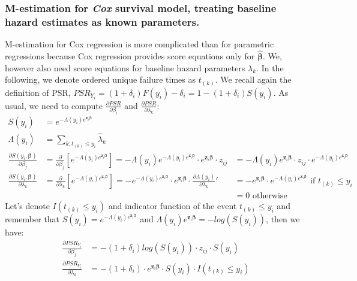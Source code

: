 \documentclass[]{article}
\begin{document}
\subsubsection{M-estimation for \emph{Cox} survival model, treating baseline hazard estimates as known parameters.}
M-estimation for Cox regression is more complicated than for parametric regressions because Cox regression provides score equations only for $\hat{\pmb{\beta}}$. We, however also need score equations for baseline hazard parameters $\lambda_k$. In the following, we denote ordered unique failure times as $t_{(k)}$. We recall again the definition of PSR, $PSR_{Y_i} =  (1+\delta_i) F(y_i)  -  \delta_i = 1- (1+\delta_i) S(y_i)$. 
As usual, we need to compute $\frac{\partial PSR}{\partial \beta_i}$ and $\frac{\partial PSR}{\partial \lambda_k}$:
$$
  \begin{aligned}
    S(y_i) &=  e^{-\Lambda(y_i) e^{\pmb{z}_i\pmb{\beta}}} \\
    \Lambda(y_i)  &= \sum_{k: t_{(k)}\leq y_i} \hat{\lambda}_k\\
    \frac{\partial S(y_i, \pmb{\beta})}{\partial \beta_j} &= \frac{\partial}{\partial \beta_j}\left[  e^{-\Lambda(y_i) e^{\pmb{z}_i\pmb{\beta}}}  \right] =   -\Lambda(y_i)e^{-\Lambda(y_i) e^{\pmb{z}_i\pmb{\beta}}}  \cdot  e^{\pmb{z}_i\pmb{\beta}}   \cdot z_{ij} &=  -\Lambda(y_i) e^{\pmb{z}_i\pmb{\beta}}   \cdot  z_{ij}  \cdot  e^{-\Lambda(y_i) e^{\pmb{z}_i\pmb{\beta}}} \\
    \frac{\partial S(y_i, \pmb{\beta})}{\partial \lambda_k} &= \frac{\partial}{\partial \lambda_k}\left[  e^{-\Lambda(y_i) e^{\pmb{z}_i\pmb{\beta}}}  \right] =   -e^{-\Lambda(y_i) e^{\pmb{z}_i\pmb{\beta}}}  \cdot  e^{\pmb{z}_i\pmb{\beta}}\cdot \frac{\partial \Lambda(y_i)}{\partial \lambda_k}' &=   -e^{\pmb{z}_i\pmb{\beta}}   \cdot  e^{-\Lambda(y_i) e^{\pmb{z}_i\pmb{\beta}}}\text{ if } t_{(k)}\leq y_i\\
    & & = 0\text{ otherwise}
  \end{aligned}
  $$
Let's denote $I(t_{(k)}\leq y_i)$ and indicator function of the event $t_{(k)}\leq y_i$ and remember that $S(y_i) =  e^{-\Lambda(y_i) e^{\pmb{z}_i\pmb{\beta}}}$ and $\Lambda(y_i) e^{\pmb{z}_i\pmb{\beta}} = -log\left(S(y_i)\right)$, then we have:
$$
  \begin{aligned}
    \frac{\partial PSR_{Y_i}}{\partial \beta_j} &=  -(1+\delta_i)log\left(S(y_i)\right) \cdot  z_{ij}  \cdot  S(y_i)\\
    \frac{\partial PSR_{Y_i}}{\partial \lambda_k} &=  -(1+\delta_i)\cdot  e^{\pmb{z}_i\pmb{\beta}}   \cdot  S(y_i) \cdot I(t_{(k)}\leq y_i)
  \end{aligned}
  $$
\end{document}
